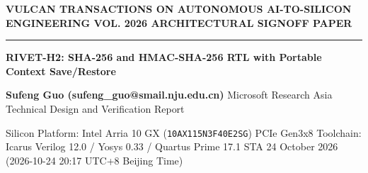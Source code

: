 \documentclass[11pt,a4paper]{article}
\begin{document}
{\scriptsize\sffamily\textcolor{vulcan}{\textbf{VULCAN TRANSACTIONS ON AUTONOMOUS AI-TO-SILICON ENGINEERING \hfill VOL. 2026 \textperiodcentered{} ARCHITECTURAL SIGNOFF PAPER}}\par}

\vspace{1pt}\textcolor{vulcan}{\rule{\textwidth}{1.2pt}}\vspace{4pt}

\begin{center}

{\sffamily\LARGE\bfseries RIVET-H2: SHA-256 and HMAC-SHA-256 RTL with Portable Context Save/\allowbreak{}Restore\par}\vspace{3pt}

{\small\sffamily\textbf{Sufeng Guo (\allowbreak{}sufeng\_\allowbreak{}guo@smail.nju.edu.cn)\allowbreak{}} \textperiodcentered{} Microsoft Research Asia \textperiodcentered{} Technical Design and Verification Report\par}\vspace{1pt}

{\scriptsize\sffamily\textcolor{black!75}{Silicon Platform: Intel Arria 10 GX (\texttt{10AX115N3F40E2SG}) PCIe Gen3x8 \textperiodcentered{} Toolchain: Icarus Verilog 12.0 / Yosys 0.33 / Quartus Prime 17.1 STA \textperiodcentered{} 24 October 2026 (\allowbreak{}2026-10-24 20:17 UTC+\allowbreak{}8 Beijing Time)\allowbreak{}}\par}

\end{center}\vspace{2pt}
\end{document}
